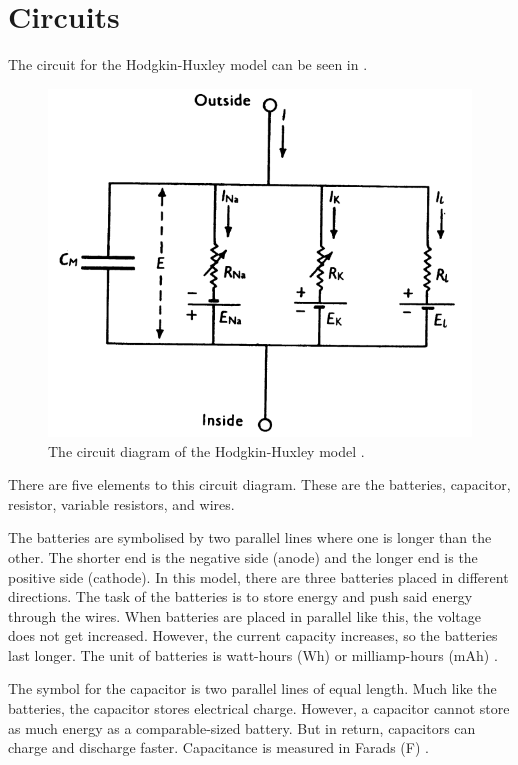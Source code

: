 \documentclass[../../Orator]{subfiles}
\begin{document}
 
 

\section{Circuits}
The circuit for the Hodgkin-Huxley model can be seen in . 

\begin{figure}[h]
    \centering
    \includegraphics[width=300 pt]{Pictures/Alex/Hodgkin-Huxley model 2.png}
    \caption{The circuit diagram of the Hodgkin-Huxley model \cite{}.}
    \label{fig:HH circuit}
\end{figure}

There are five elements to this circuit diagram. These are the batteries, capacitor, resistor, variable resistors, and wires. 

The batteries are symbolised by two parallel lines where one is longer than the other. The shorter end is the negative side (anode) and the longer end is the positive side (cathode). In this model, there are three batteries placed in different directions. The task of the batteries is to store energy and push said energy through the wires. When batteries are placed in parallel like this, the voltage does not get increased. However, the current capacity increases, so the batteries last longer. The unit of batteries is watt-hours (Wh) or milliamp-hours (mAh) \cite{}. 

The symbol for the capacitor is two parallel lines of equal length. Much like the batteries, the capacitor stores electrical charge. However, a capacitor cannot store as much energy as a comparable-sized battery. But in return, capacitors can charge and discharge faster. Capacitance is measured in Farads (\unit{\farad}) \cite{}.
\end{document}
